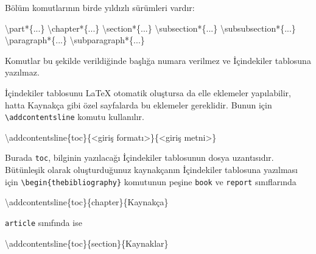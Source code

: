 \documentclass[
  letterpaper,
  DIV=11,
  numbers=noendperiod]{scrreprt}
\newenvironment{Shaded}{\begin{snugshade}}{\end{snugshade}}
\newcommand{\FunctionTok}[1]{\textcolor[rgb]{0.28,0.35,0.67}{#1}}
\newcommand{\KeywordTok}[1]{\textcolor[rgb]{0.00,0.23,0.31}{#1}}
\newcommand{\NormalTok}[1]{\textcolor[rgb]{0.00,0.23,0.31}{#1}}
\begin{document}
Bölüm komutlarının birde yıldızlı sürümleri vardır:

\begin{Shaded}
\begin{Highlighting}[]
\KeywordTok{\textbackslash{}part*}\NormalTok{\{...\}}
\KeywordTok{\textbackslash{}chapter*}\NormalTok{\{...\}}
\KeywordTok{\textbackslash{}section*}\NormalTok{\{...\}}
\KeywordTok{\textbackslash{}subsection*}\NormalTok{\{...\}}
\KeywordTok{\textbackslash{}subsubsection*}\NormalTok{\{...\}}
\KeywordTok{\textbackslash{}paragraph*}\NormalTok{\{...\}}
\KeywordTok{\textbackslash{}subparagraph*}\NormalTok{\{...\}}
\end{Highlighting}
\end{Shaded}

Komutlar bu şekilde verildiğinde başlığa numara verilmez ve İçindekiler
tablosuna yazılmaz.

İçindekiler tablosunu {\LaTeX} otomatik oluştursa da elle eklemeler
yapılabilir, hatta Kaynakça gibi özel sayfalarda bu eklemeler
gereklidir. Bunun için \texttt{\textbackslash{}addcontentsline} komutu
kullanılır.

\begin{Shaded}
\begin{Highlighting}[]
\FunctionTok{\textbackslash{}addcontentsline}\NormalTok{\{toc\}\{\textless{}giriş formatı\textgreater{}\}\{\textless{}giriş metni\textgreater{}\}}
\end{Highlighting}
\end{Shaded}

Burada \texttt{toc}, bilginin yazılacağı İçindekiler tablosunun dosya
uzantısıdır. Bütünleşik olarak oluşturduğunuz kaynakçanın İçindekiler
tablosuna yazılması için
\texttt{\textbackslash{}begin\{thebibliography\}} komutunun peşine
\texttt{book} ve \texttt{report} sınıflarında

\begin{Shaded}
\begin{Highlighting}[]
\FunctionTok{\textbackslash{}addcontentsline}\NormalTok{\{toc\}\{chapter\}\{Kaynakça\}}
\end{Highlighting}
\end{Shaded}

\texttt{article} sınıfında ise

\begin{Shaded}
\begin{Highlighting}[]
\FunctionTok{\textbackslash{}addcontentsline}\NormalTok{\{toc\}\{section\}\{Kaynaklar\}}
\end{Highlighting}
\end{Shaded}
\end{document}
